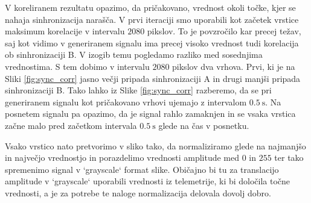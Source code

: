 \documentclass{article}
\begin{document}
V koreliranem rezultatu opazimo, da pričakovano, vrednost okoli točke, kjer se nahaja sinhronizacija narašča. V prvi iteraciji smo uporabili kot začetek vrstice maksimum korelacije v intervalu $2080$ pikslov. To je povzročilo kar precej težav, saj kot vidimo v generiranem signalu ima precej visoko vrednost tudi korelacija ob sinhronizaciji B. V izogib temu pogledamo razliko med sosednjima vrednostima. S tem dobimo v intervalu $2080$ pikslov dva vrhova. Prvi, ki je na Sliki \ref{fig:sync_corr} jasno večji pripada sinhronizaciji A in drugi manjši pripada sinhronizaciji B. Tako lahko iz Slike \ref{fig:sync_corr} razberemo, da se pri generiranem signalu kot pričakovano vrhovi ujemajo z intervalom $\SI{0.5}{\second}$. Na posnetem signalu pa opazimo, da je signal rahlo zamaknjen in se vsaka vrstica začne malo pred začetkom intervala $\SI{0.5}{\second}$ glede na čas v posnetku.

Vsako vrstico nato pretvorimo v sliko tako, da normaliziramo glede na najmanjšo in največjo vrednostjo in porazdelimo vrednosti amplitude med $0$ in $255$ ter tako spremenimo signal v `grayscale` format slike. Običajno bi tu za translacijo amplitude v `grayscale` uporabili vrednosti iz telemetrije, ki bi določila točne vrednosti, a je za potrebe te naloge normalizacija delovala dovolj dobro.
\end{document}
